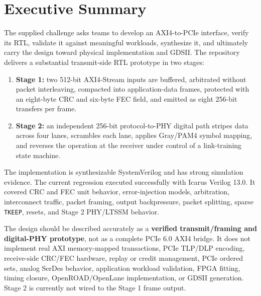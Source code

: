 \documentclass[11pt,a4paper]{article}
\newcommand{\code}[1]{\texttt{#1}}
\begin{document}
\section{Executive Summary}

The supplied challenge asks teams to develop an AXI4-to-PCIe interface, verify its RTL,
validate it against meaningful workloads, synthesize it, and ultimately carry the design
toward physical implementation and GDSII. The repository delivers a substantial
transmit-side RTL prototype in two stages:

\begin{enumerate}[leftmargin=*]
    \item \textbf{Stage 1:} two 512-bit AXI4-Stream inputs are buffered, arbitrated without
    packet interleaving, compacted into application-data frames, protected with an
    eight-byte CRC and six-byte FEC field, and emitted as eight 256-bit transfers per frame.
    \item \textbf{Stage 2:} an independent 256-bit protocol-to-PHY digital path stripes data
    across four lanes, scrambles each lane, applies Gray/PAM4 symbol mapping, and reverses
    the operation at the receiver under control of a link-training state machine.
\end{enumerate}

The implementation is synthesizable SystemVerilog and has strong simulation evidence.
The current regression executed successfully with Icarus Verilog 13.0. It covered CRC and
FEC unit behavior, error-injection models, arbitration, interconnect traffic, packet
framing, output backpressure, packet splitting, sparse \code{TKEEP}, resets, and Stage 2
PHY/LTSSM behavior.

\begin{keybox}
The design should be described accurately as a \textbf{verified transmit/framing and
digital-PHY prototype}, not as a complete PCIe 6.0 AXI4 bridge. It does not implement real
AXI memory-mapped transactions, PCIe TLP/DLP encoding, receive-side CRC/FEC hardware,
replay or credit management, PCIe ordered sets, analog SerDes behavior, application
workload validation, FPGA fitting, timing closure, OpenROAD/OpenLane implementation, or
GDSII generation. Stage 2 is currently not wired to the Stage 1 frame output.
\end{keybox}

\end{document}
